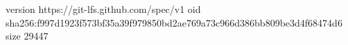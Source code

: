 version https://git-lfs.github.com/spec/v1
oid sha256:f997d1923f573bf35a39f979850bd2ae769a73c966d386bb809be3d4f68474d6
size 29447

